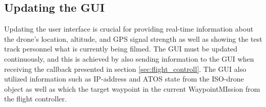 \subsection{Updating the GUI} \label{sec:updating_UI}

Updating the user interface is crucial for providing real-time information about the drone's location, altitude, and GPS signal strength as well as showing the test track personnel what is currently being filmed. The GUI must be updated continuously, and this is achieved by also sending information to the GUI when receiving the callback presented in section \ref{sec:flight_controll}. The GUI also utilized information such as IP-address and ATOS state from the ISO-drone object as well as which the target waypoint in the current WaypointMIssion from the flight controller. 



